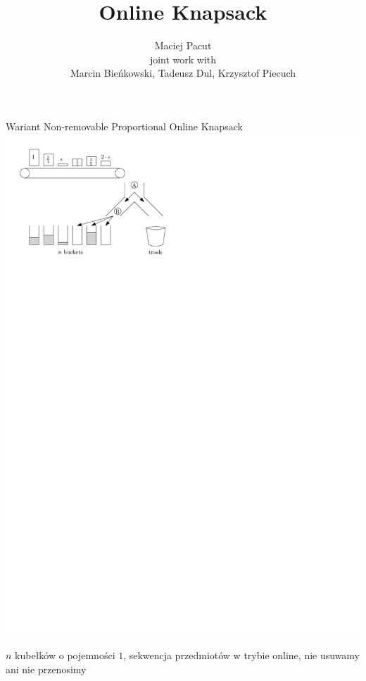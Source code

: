 \documentclass{beamer}
\title[]{Online Knapsack}
\author{Maciej Pacut\\
  joint work with\\Marcin Bieńkowski, Tadeusz Dul, Krzysztof Piecuch
}
\begin{document}
\begin{frame}
  \titlepage
\end{frame}

\begin{frame}{Wariant Non-removable Proportional Online Knapsack}
  \includegraphics{figs/problem_formulation.pdf}
  
   \tiny $n$ kubełków o pojemności $1$, sekwencja przedmiotów w trybie online, nie usuwamy ani nie przenosimy
\end{frame}
\end{document}
